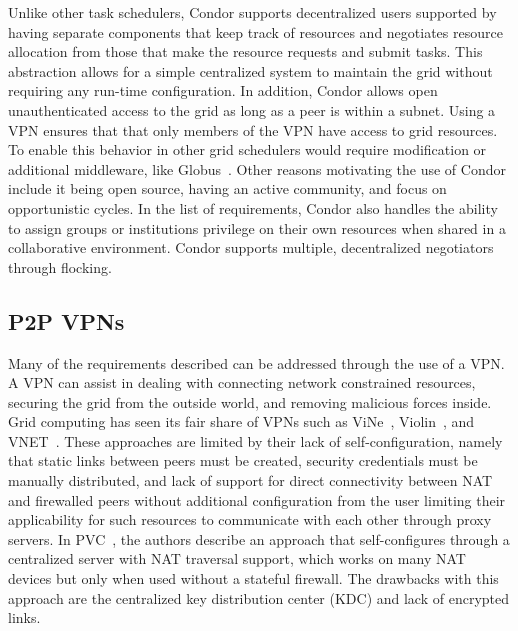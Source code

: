 \documentclass{sig-alternate}
\begin{document}
Unlike other task schedulers, Condor supports decentralized users supported
by having separate
components that keep track of resources and negotiates resource allocation from
those that make the resource requests and submit tasks.  This abstraction
allows for a simple centralized system to maintain the grid without requiring
any run-time configuration.  In addition, Condor allows open unauthenticated
access to the grid as long as a peer is within a subnet.  Using a VPN ensures
that that only members of the VPN have access to grid resources.  To enable this
behavior in other grid schedulers would require modification or additional
middleware, like Globus~\cite{globus_toolkit}.  Other reasons motivating the
use of Condor include it being open source, having an active community, and
focus on opportunistic cycles.  In the list of requirements, Condor also
handles the ability to assign groups or institutions privilege on their own
resources when shared in a collaborative environment.  Condor supports
multiple, decentralized negotiators through flocking.


\subsection{P2P VPNs}
Many of the requirements described can be addressed through the use of a
VPN.  A VPN can assist in dealing with connecting network constrained resources,
securing the grid from the outside world, and removing malicious forces inside.
Grid computing has seen its fair share of VPNs such as ViNe~\cite{vine},
Violin~\cite{violin}, and VNET~\cite{vnet}.  These approaches are limited by
their lack of self-configuration, namely that static links between peers must
be created, security credentials must be manually distributed, and lack of
support for direct connectivity between NAT and firewalled peers without
additional configuration from the user limiting their applicability for such
resources to communicate with each other through proxy servers.  In
PVC~\cite{pvc}, the authors describe an approach that self-configures through
a centralized server with NAT traversal support, which works on many
NAT devices but only when used without a stateful firewall.  The drawbacks with
this approach are the centralized key distribution center (KDC) and lack of
encrypted links.
\end{document}
